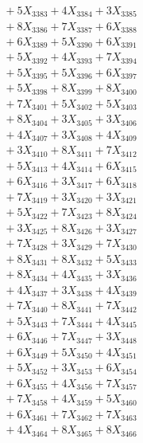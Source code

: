 \documentclass[a4paper,10pt]{article}
\begin{document}
{\begin{align}
&\;  + 5 X_{3383} + 4 X_{3384} + 3 X_{3385} \\[0.3ex]
&\;  + 8 X_{3386} + 7 X_{3387} + 6 X_{3388} \\[0.3ex]
&\;  + 6 X_{3389} + 5 X_{3390} + 6 X_{3391} \\[0.3ex]
&\;  + 5 X_{3392} + 4 X_{3393} + 7 X_{3394} \\[0.3ex]
&\;  + 5 X_{3395} + 5 X_{3396} + 6 X_{3397} \\[0.3ex]
&\;  + 5 X_{3398} + 8 X_{3399} + 8 X_{3400} \\[0.5ex]\allowbreak
&\;  + 7 X_{3401} + 5 X_{3402} + 5 X_{3403} \\[0.3ex]
&\;  + 8 X_{3404} + 3 X_{3405} + 3 X_{3406} \\[0.3ex]
&\;  + 4 X_{3407} + 3 X_{3408} + 4 X_{3409} \\[0.3ex]
&\;  + 3 X_{3410} + 8 X_{3411} + 7 X_{3412} \\[0.3ex]
&\;  + 5 X_{3413} + 4 X_{3414} + 6 X_{3415} \\[0.3ex]
&\;  + 6 X_{3416} + 3 X_{3417} + 6 X_{3418} \\[0.3ex]
&\;  + 7 X_{3419} + 3 X_{3420} + 3 X_{3421} \\[0.3ex]
&\;  + 5 X_{3422} + 7 X_{3423} + 8 X_{3424} \\[0.3ex]
&\;  + 3 X_{3425} + 8 X_{3426} + 3 X_{3427} \\[0.3ex]
&\;  + 7 X_{3428} + 3 X_{3429} + 7 X_{3430} \\[0.5ex]\allowbreak
&\;  + 8 X_{3431} + 8 X_{3432} + 5 X_{3433} \\[0.3ex]
&\;  + 8 X_{3434} + 4 X_{3435} + 3 X_{3436} \\[0.3ex]
&\;  + 4 X_{3437} + 3 X_{3438} + 4 X_{3439} \\[0.3ex]
&\;  + 7 X_{3440} + 8 X_{3441} + 7 X_{3442} \\[0.3ex]
&\;  + 5 X_{3443} + 7 X_{3444} + 4 X_{3445} \\[0.3ex]
&\;  + 6 X_{3446} + 7 X_{3447} + 3 X_{3448} \\[0.3ex]
&\;  + 6 X_{3449} + 5 X_{3450} + 4 X_{3451} \\[0.3ex]
&\;  + 5 X_{3452} + 3 X_{3453} + 6 X_{3454} \\[0.3ex]
&\;  + 6 X_{3455} + 4 X_{3456} + 7 X_{3457} \\[0.3ex]
&\;  + 7 X_{3458} + 4 X_{3459} + 5 X_{3460} \\[0.5ex]\allowbreak
&\;  + 6 X_{3461} + 7 X_{3462} + 7 X_{3463} \\[0.3ex]
&\;  + 4 X_{3464} + 8 X_{3465} + 8 X_{3466} \\[0.3ex]

\end{align}}
\end{document}
